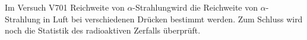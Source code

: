 Im Versuch V701 \textacutedbl Reichweite von $\alpha$-Strahlung\textacutedbl wird die Reichweite von $\alpha$-Strahlung in Luft bei verschiedenen Drücken bestimmt werden. 
Zum Schluss wird noch die Statistik des radioaktiven Zerfalls überprüft.
